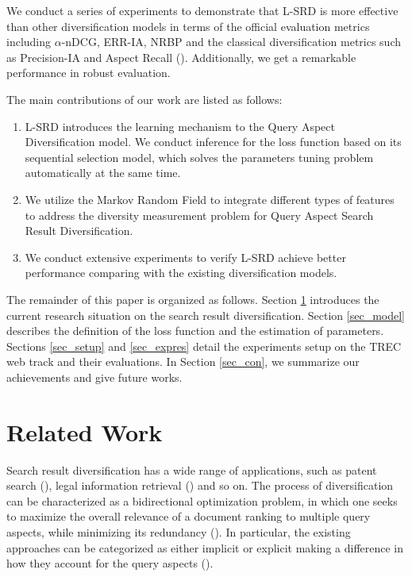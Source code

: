\documentclass[review]{elsarticle}
\newcommand\revised[1]{{\color{black} #1}}
\begin{document}
We conduct a series of experiments to demonstrate that L-SRD is more effective than other diversification models in terms of the official evaluation metrics including $\alpha$-nDCG, ERR-IA, NRBP  and the classical diversification metrics such as Precision-IA and Aspect Recall (\cite{clarke2008novelty,chapelle2009expected,clarke2009effectiveness}). Additionally, we get a remarkable performance in robust evaluation.

The main contributions of our work are listed as follows:
\begin{enumerate}
	\item L-SRD introduces the learning mechanism to the Query Aspect Diversification model. We conduct inference for the loss function based on its sequential selection model, which solves the parameters tuning problem automatically at the same time.
	\item We utilize the Markov Random Field to integrate different types of features to address the diversity measurement problem for Query Aspect Search Result Diversification.
	\item We conduct extensive experiments to verify L-SRD achieve better performance comparing with the existing diversification models.
\end{enumerate}

The remainder of this paper is organized as follows. Section \ref{sec_rel} introduces the current research situation on the search result diversification. Section \ref{sec_model} describes the definition of the loss function and the estimation of parameters. Sections \ref{sec_setup} and \ref{sec_expres} detail the experiments setup on the TREC web track and their evaluations. In Section \ref{sec_con}, we summarize our achievements and give future works.

\section{Related Work}\label{sec_rel}


\revised{
	Search result diversification has a wide range of applications, such as patent search (\cite{Kim:2015:IPS:2808194.2809455}), legal information retrieval (\cite{a10010022}) and so on.
	The process of diversification can be characterized as a bidirectional optimization problem, in which one seeks to maximize the overall relevance of a document ranking to multiple query aspects, while minimizing its redundancy (\cite{Santos:2010:EQR:1772690.1772780}). In particular, the existing approaches can be categorized as either implicit or explicit making a difference in how they account for the query aspects (\cite{10.1007/978-3-642-12275-0_11}).
	}
\end{document}
